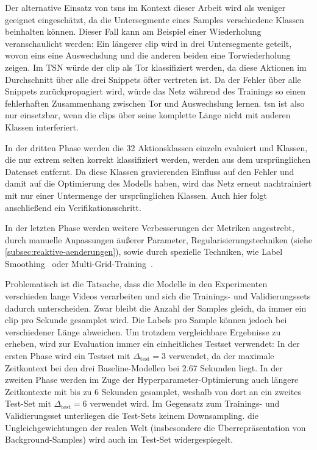 Der alternative Einsatz von \glspl{tsn} im Kontext dieser Arbeit wird als weniger geeignet eingeschätzt, da die Untersegmente eines Samples verschiedene Klassen beinhalten können.
Dieser Fall kann am Beispiel einer Wiederholung veranschaulicht werden:
Ein längerer \gls{clip} wird in drei Untersegmente geteilt, wovon eins eine Auswechslung und die anderen beiden eine Torwiederholung zeigen.
Im TSN würde der \gls{clip} als Tor klassifiziert werden, da diese Aktionen im Durchschnitt über alle drei Snippets öfter vertreten ist.
Da der Fehler über alle Snippets zurückpropagiert wird, würde das Netz während des Trainings so einen fehlerhaften Zusammenhang zwischen Tor und Auswechslung lernen.
\gls{tsn} ist also nur einsetzbar, wenn die \glspl{clip} über seine komplette Länge nicht mit anderen Klassen interferiert.

In der dritten Phase werden die 32 Aktionsklassen einzeln evaluiert und Klassen, die nur extrem selten korrekt klassifiziert werden, werden aus dem ursprünglichen Datenset entfernt.
Da diese Klassen gravierenden Einfluss auf den Fehler und damit auf die Optimierung des Modells haben, wird das Netz erneut nachtrainiert mit nur einer Untermenge der ursprünglichen Klassen.
Auch hier folgt anschließend ein Verifikationsschritt.

In der letzten Phase werden weitere Verbesserungen der Metriken angestrebt, durch manuelle Anpassungen äußerer Parameter, Regularisierungstechniken (siehe \autoref{subsec:reaktive-aenderungen}), sowie durch spezielle Techniken, wie Label Smoothing~\cite{Szegedy16} oder Multi-Grid-Training~\cite{Wu20}.

Problematisch ist die Tatsache, dass die Modelle in den Experimenten verschieden lange Videos verarbeiten und sich die Trainings- und Validierungssets dadurch unterscheiden.
Zwar bleibt die Anzahl der Samples gleich, da immer ein \gls{clip} pro Sekunde gesamplet wird.
Die Labels pro Sample können jedoch bei verschiedener Länge abweichen.
Um trotzdem vergleichbare Ergebnisse zu erheben, wird zur Evaluation immer ein einheitliches Testset verwendet:
In der ersten Phase wird ein Testset mit $\Delta_\text{test}=3$ verwendet, da der maximale Zeitkontext bei den drei Baseline-Modellen bei 2.67 Sekunden liegt.
In der zweiten Phase werden im Zuge der Hyperparameter-Optimierung auch längere Zeitkontexte mit bis zu 6 Sekunden gesamplet, weshalb von dort an ein zweites Test-Set mit $\Delta_\text{test}=6$ verwendet wird.
Im Gegensatz zum Trainings- und Validierungsset unterliegen die Test-Sets keinem Downsampling.
\Dh die Ungleichgewichtungen der realen Welt (insbesondere die Überrepräsentation von Background-Samples) wird auch im Test-Set widergespiegelt.

